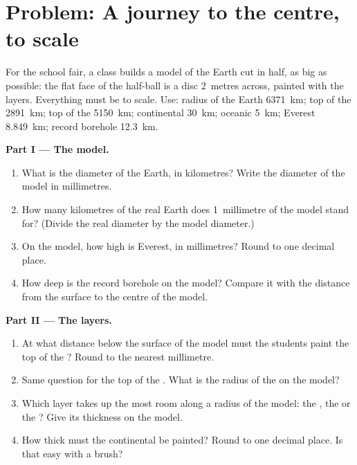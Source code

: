 \section{Problem: A journey to the centre, to scale}

\begin{problem}
\label{pb:g6:inside-the-earth:1}
For the school fair, a class builds a model of the Earth cut in half, as
big as possible: the flat face of the half-ball is a disc 2~metres across,
painted with the layers. Everything must be to scale. Use: radius of the
Earth 6371~km; top of the  2891~km; top of the 
5150~km; continental  30~km; oceanic  5~km; Everest 8.849~km;
record borehole 12.3~km.

\medskip
\noindent\textbf{Part I --- The model.}
\begin{enumerate}
  \item What is the diameter of the Earth, in kilometres? Write the
        diameter of the model in millimetres.
  \item How many kilometres of the real Earth does 1~millimetre of the
        model stand for? (Divide the real diameter by the model diameter.)
  \item On the model, how high is Everest, in millimetres? Round to one
        decimal place.
  \item How deep is the record borehole on the model? Compare it with the
        distance from the surface to the centre of the model.
\end{enumerate}

\medskip
\noindent\textbf{Part II --- The layers.}
\begin{enumerate}[resume]
  \item At what distance below the surface of the model must the students
        paint the top of the ? Round to the nearest millimetre.
  \item Same question for the top of the . What is the radius of
        the  on the model?
  \item Which layer takes up the most room along a radius of the model:
        the , the  or the ? Give its thickness on
        the model.
  \item How thick must the continental  be painted? Round to one
        decimal place. Is that easy with a brush?
\end{enumerate}


\end{problem}
